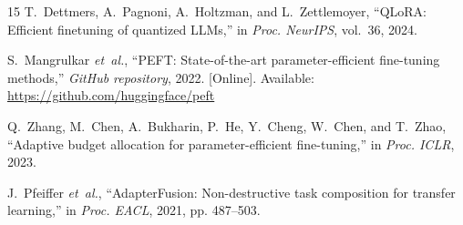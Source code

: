 \documentclass[conference]{IEEEtran}
\begin{document}
\begin{thebibliography}{15}
T.~Dettmers, A.~Pagnoni, A.~Holtzman, and L.~Zettlemoyer, ``QLoRA: Efficient finetuning of quantized LLMs,'' in \emph{Proc. NeurIPS}, vol.~36, 2024.

S.~Mangrulkar \emph{et~al.}, ``PEFT: State-of-the-art parameter-efficient fine-tuning methods,'' \emph{GitHub repository}, 2022. [Online]. Available: \url{https://github.com/huggingface/peft}

Q.~Zhang, M.~Chen, A.~Bukharin, P.~He, Y.~Cheng, W.~Chen, and T.~Zhao, ``Adaptive budget allocation for parameter-efficient fine-tuning,'' in \emph{Proc. ICLR}, 2023.

J.~Pfeiffer \emph{et~al.}, ``AdapterFusion: Non-destructive task composition for transfer learning,'' in \emph{Proc. EACL}, 2021, pp. 487--503.

\end{thebibliography}
\end{document}
